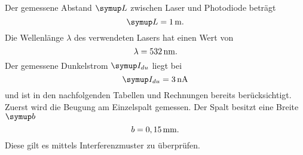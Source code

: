 Der gemessene Abstand $\su{L}$ zwischen Laser und Photodiode beträgt
\begin{equation*}
  \su{L} = 1\mt.
\end{equation*}
Die Wellenlänge $\lambda$ des verwendeten Lasers hat einen Wert von
\begin{equation*}
  \lambda = 532 \,\si{\nano\meter}.
\end{equation*}
Der gemessene Dunkelstrom $\su{I_{du}}$ liegt bei
\begin{equation*}
  \su{I_{du}} = 3\nA
\end{equation*}
und ist in den nachfolgenden Tabellen und Rechnungen bereits berücksichtigt.
Zuerst wird die Beugung am Einzelspalt gemessen. Der Spalt besitzt eine Breite
$\su{b}$
\begin{equation*}
  b=0,15\,\si{\milli\meter}.
\end{equation*}
Diese gilt es mittels Interferenzmuster zu überprüfen.

